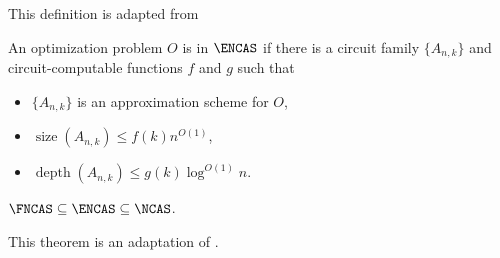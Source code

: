 \documentclass{article}
\DeclareMathOperator{\depth}{depth}
\DeclareMathOperator{\size}{size}
\begin{document}
This definition is adapted from \autocite[Definition~1.31]{fg06}

\begin{definition}
  An optimization problem $O$ is in $\ENCAS$ if there is a circuit family $\{A_{n, k}\}$ and circuit-computable functions $f$ and $g$ such that
  \begin{itemize}
  \item $\{A_{n, k}\}$ is an approximation scheme for $O$,
  \item $\size(A_{n, k}) \leq f(k) n^{O(1)}$,
  \item $\depth(A_{n, k}) \leq g(k) \log^{O(1)} n$.
  \end{itemize}
\end{definition}

\begin{proposition}\label{prop:encas}
  $\FNCAS \subseteq \ENCAS \subseteq \NCAS$.
\end{proposition}

This theorem is an adaptation of \autocite[Theorem~1.32]{fg06}.
\end{document}
